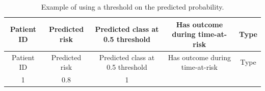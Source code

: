 \documentclass[11pt]{book}
\theoremstyle{definition}
\theoremstyle{definition}
\theoremstyle{definition}
\theoremstyle{remark}
\begin{document}
\begin{longtable}[]{@{}ccccc@{}}
\caption{\label{tab:tabletheorytab} Example of using a threshold on the
predicted probability.}\tabularnewline
\toprule
\begin{minipage}[b]{0.12\columnwidth}\centering\strut
Patient ID\strut
\end{minipage} & \begin{minipage}[b]{0.14\columnwidth}\centering\strut
Predicted risk\strut
\end{minipage} & \begin{minipage}[b]{0.14\columnwidth}\centering\strut
Predicted class at 0.5 threshold\strut
\end{minipage} & \begin{minipage}[b]{0.14\columnwidth}\centering\strut
Has outcome during time-at-risk\strut
\end{minipage} & \begin{minipage}[b]{0.11\columnwidth}\centering\strut
Type\strut
\end{minipage}\tabularnewline
\midrule
\endfirsthead
\toprule
\begin{minipage}[b]{0.12\columnwidth}\centering\strut
Patient ID\strut
\end{minipage} & \begin{minipage}[b]{0.14\columnwidth}\centering\strut
Predicted risk\strut
\end{minipage} & \begin{minipage}[b]{0.14\columnwidth}\centering\strut
Predicted class at 0.5 threshold\strut
\end{minipage} & \begin{minipage}[b]{0.14\columnwidth}\centering\strut
Has outcome during time-at-risk\strut
\end{minipage} & \begin{minipage}[b]{0.11\columnwidth}\centering\strut
Type\strut
\end{minipage}\tabularnewline
\midrule
\endhead
\begin{minipage}[t]{0.12\columnwidth}\centering\strut
1\strut
\end{minipage} & \begin{minipage}[t]{0.14\columnwidth}\centering\strut
0.8\strut
\end{minipage} & \begin{minipage}[t]{0.14\columnwidth}\centering\strut
1\strut
\end{minipage} & \begin{minipage}[t]{0.14\columnwidth}\centering\strut

\end{minipage}
\end{longtable}
\end{document}
